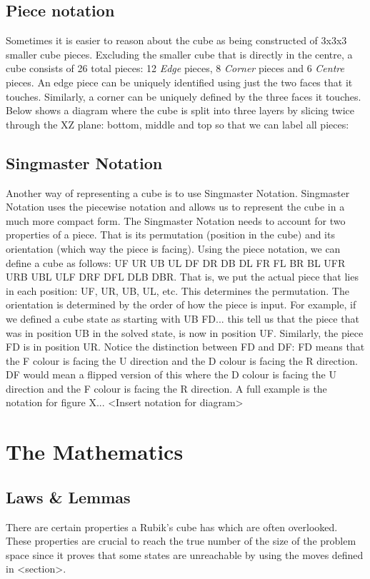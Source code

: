 \documentclass[titlepage]{report}[12pt]
\begin{document}
\subsection{Piece notation}
Sometimes it is easier to reason about the cube as being constructed of 3x3x3 smaller cube pieces. Excluding the smaller cube that is directly in the centre, a cube consists of 26 total pieces: 12 \textit{Edge} pieces, 8 \textit{Corner} pieces and 6 \textit{Centre} pieces. An edge piece can be uniquely identified using just the two faces that it touches. Similarly, a corner can be uniquely defined by the three faces it touches. Below shows a diagram where the cube is split into three layers by slicing twice through the XZ plane: bottom, middle and top so that we can label all pieces:

\subsection{Singmaster Notation}
Another way of representing a cube is to use Singmaster Notation. Singmaster Notation uses the piecewise notation and allows us to represent the cube in a much more compact form. The Singmaster Notation needs to account for two properties of a piece. That is its permutation (position in the cube) and its orientation (which way the piece is facing). Using the piece notation, we can define a cube as follows: UF UR UB UL DF DR DB DL FR FL BR BL UFR URB UBL ULF DRF DFL DLB DBR. That is, we put the actual piece that lies in each position: UF, UR, UB, UL, etc. This determines the permutation. The orientation is determined by the order of how the piece is input. For example, if we defined a cube state as starting with UB FD... this tell us that the piece that was in position UB in the solved state, is now in position UF. Similarly, the piece FD is in position UR. Notice the distinction between FD and DF: FD means that the F colour is facing the U direction and the D colour is facing the R direction. DF would mean a flipped version of this where the D colour is facing the U direction and the F colour is facing the R direction. A full example is the notation for figure X... <Insert notation for diagram>

\clearpage
\section{The Mathematics}

\subsection{Laws \& Lemmas}
There are certain properties a Rubik's cube has which are often overlooked. These properties are crucial to reach the true number of the size of the problem space since it proves that some states are unreachable by using the moves defined in <section>.
\end{document}
